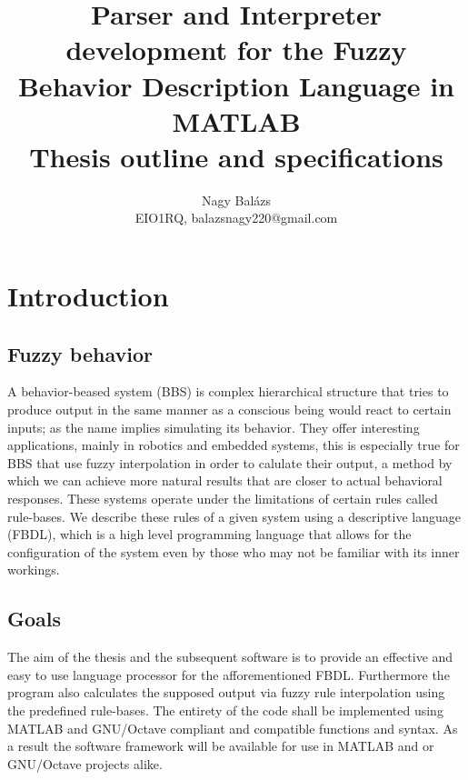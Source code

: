 \documentclass[12pt, titlepage]{article}
\begin{document}
\pagestyle{fancy}

\title{Parser and Interpreter development for the Fuzzy Behavior Description Language in MATLAB\\Thesis outline and specifications}
\author{Nagy Balázs \\EIO1RQ, balazsnagy220@gmail.com}

\maketitle

\pagebreak

\section{Introduction}
\subsection{Fuzzy behavior}
A behavior-beased system (BBS) is complex hierarchical structure that tries to produce output in the same manner as a conscious being would react to certain inputs; as the name implies simulating its behavior. They offer interesting applications, mainly in robotics and embedded systems, this is especially true for BBS that use fuzzy interpolation in order to calulate their output, a method by which we can achieve more natural results that are closer to actual behavioral responses. These systems operate under the limitations of certain rules called rule-bases. We describe these rules of a given system using a descriptive language (FBDL), which is a high level programming language that allows for the configuration of the system even by those who may not be familiar with its inner workings.

\subsection{Goals}
The aim of the thesis and the subsequent software is to provide an effective and easy to use language processor for the afforementioned FBDL. Furthermore the program also calculates the supposed output via fuzzy rule interpolation using the predefined rule-bases. The entirety of the code shall be implemented using MATLAB and GNU/Octave compliant and compatible functions and syntax. As a result the software framework will be available for use in MATLAB and or GNU/Octave projects alike.
\end{document}

